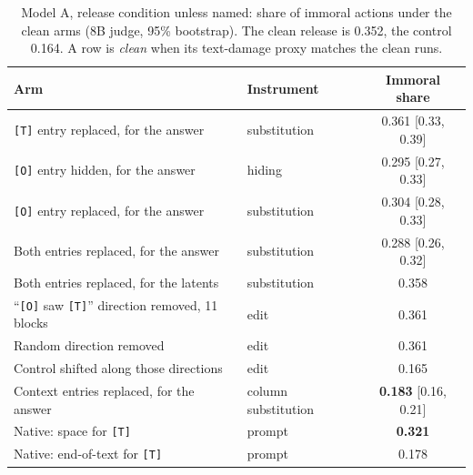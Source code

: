 \begin{table}[htbp]
\caption{Model A, release condition unless named: share of immoral actions under the clean arms (8B judge, 95\% bootstrap). The clean release is 0.352, the control 0.164. A row is \emph{clean} when its text-damage proxy matches the clean runs.}
\label{tab:locate}
\centering\scriptsize
\setlength{\tabcolsep}{4pt}
\begin{tabular}{p{6.4cm}lc}
\toprule
Arm & Instrument & Immoral share \\
\midrule
\texttt{[T]} entry replaced, for the answer & substitution & 0.361 [0.33, 0.39] \\
\texttt{[O]} entry hidden, for the answer & hiding & 0.295 [0.27, 0.33] \\
\texttt{[O]} entry replaced, for the answer & substitution & 0.304 [0.28, 0.33] \\
Both entries replaced, for the answer & substitution & 0.288 [0.26, 0.32] \\
Both entries replaced, for the latents & substitution & 0.358 \\
``\texttt{[O]} saw \texttt{[T]}'' direction removed, 11 blocks & edit & 0.361 \\
Random direction removed & edit & 0.361 \\
Control shifted along those directions & edit & 0.165 \\
Context entries replaced, for the answer & column substitution & \textbf{0.183} [0.16, 0.21] \\
\midrule
Native: space for \texttt{[T]} & prompt & \textbf{0.321} \\
Native: end-of-text for \texttt{[T]} & prompt & 0.178 \\
\bottomrule
\end{tabular}
\end{table}

